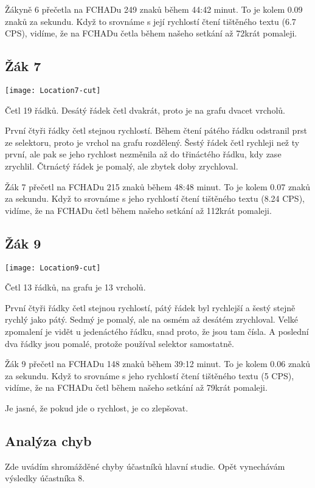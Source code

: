 Žákyně 6 přečetla na FCHADu 249 znaků během 44:42 minut.  To je kolem 0.09 znaků za sekundu. Když to srovnáme s její rychlostí čtení tištěného textu (6.7 CPS), vidíme, že na FCHADu četla během našeho setkání až 72krát pomaleji.


\subsection{Žák 7}
\texttt{[image: Location7-cut]}

Četl 19 řádků. Desátý řádek četl dvakrát, proto je na grafu dvacet vrcholů.

První čtyři řádky četl stejnou rychlostí. Během čtení pátého řádku odstranil prst ze selektoru, proto je vrchol na grafu rozdělený. Šestý řádek četl rychleji než ty první, ale pak se jeho rychlost nezměnila až do třináctého řádku, kdy zase zrychlil.  Čtrnáctý řádek je pomalý, ale zbytek doby zrychloval.


Žák 7 přečetl na FCHADu 215 znaků během 48:48 minut.  To je kolem 0.07 znaků za sekundu. Když to srovnáme s jeho rychlostí čtení tištěného textu (8.24 CPS), vidíme, že na FCHADu četl během našeho setkání až 112krát pomaleji.

\subsection{Žák 9}
\texttt{[image: Location9-cut]}

Četl 13 řádků, na grafu je 13 vrcholů.

První čtyři řádky četl stejnou rychlostí, pátý řádek byl rychlejší a šestý stejně rychlý jako pátý. Sedmý je pomalý, ale na osmém až desátém zrychloval.  Velké zpomalení je vidět u jedenáctého řádku, snad proto, že jsou tam čísla. A poslední dva řádky jsou pomalé, protože používal selektor samostatně.

Žák 9 přečetl na FCHADu 148 znaků během 39:12 minut.  To je kolem 0.06 znaků za sekundu. Když to srovnáme s jeho rychlostí čtení tištěného textu (5 CPS), vidíme, že na FCHADu četl během našeho setkání až 79krát pomaleji.

Je jasné, že pokud jde o rychlost, je co zlepšovat.

\subsection{Analýza chyb}

Zde uvádím shromážděné chyby účastníků hlavní studie.  Opět vynechávám výsledky účastníka 8.

